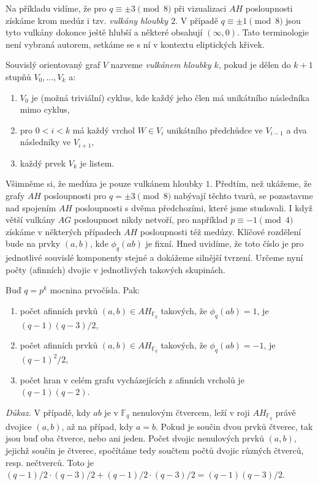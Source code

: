 \documentclass[12pt]{report}
\begin{document}
Na příkladu vidíme, že pro $q \equiv \pm 3 \pmod{8}$ při vizualizaci $AH$ posloupnosti získáme krom medúz i tzv. \textit{vulkány hloubky $2$}. V případě $q \equiv \pm 1 \pmod{8}$ jsou tyto vulkány dokonce ještě hlubší a některé obsahují $(\infty,0)$. Tato terminologie není vybraná autorem, setkáme se s ní v kontextu eliptických křivek.
\begin{definice}
Souvislý orientovaný graf $V$ nazveme \textit{vulkánem hloubky $k$}, pokud je dělen do $k+1$ stupňů $V_0,\dots,V_k$ a:
\begin{enumerate}
\item $V_0$ je (možná triviální) cyklus, kde každý jeho člen má unikátního následníka mimo cyklus,
\item pro $0 <i < k$ má každý vrchol $W \in V_i$ unikátního předchůdce ve $V_{i-1}$ a dva následníky ve $V_{i+1}$,
\item každý prvek $V_k$ je listem.
\end{enumerate}
\end{definice}
Všimněme si, že medúza je pouze vulkánem hloubky $1$. Předtím, než ukážeme, že grafy $AH$ posloupnosti pro $q = \pm 3 \pmod{8}$ nabývají těchto tvarů, se pozastavme nad spojením $AH$ posloupnosti s dvěma předchozími, které jsme studovali. I když větší vulkány $AG$ posloupnost nikdy netvoří, pro například $p \equiv -1 \pmod{4}$ získáme v některých případech $AH$ posloupnosti též medúzy. Klíčové rozdělení bude na prvky $(a,b)$, kde $\phi_q (ab)$ je fixní. Hned uvidíme, že toto číslo je pro jednotlivé souvislé komponenty stejné a dokážeme silnější tvrzení. Určeme nyní počty (afinních) dvojic v jednotlivých takových skupinách.

\begin{veta}
Buď $q = p^k$ mocnina prvočísla. Pak:
\begin{enumerate}
\item počet afinních prvků $(a,b) \in AH_{\mathbb{F}_q}$ takových, že $\phi_q(ab) = 1$, je $(q-1)(q-3)/2$, 
\item počet afinních prvků $(a,b) \in AH_{\mathbb{F}_q}$ takových, že $\phi_q(ab) = -1$, je $(q-1)^2/2$,
\item počet hran v celém grafu vycházejících z afinních vrcholů je $(q-1)(q-2)$.
\end{enumerate}

\end{veta}  
\noindent \textit{Důkaz.} V případě, kdy $ab$ je v $\mathbb{F}_q$ nenulovým čtvercem, leží v roji $AH_{\mathbb{F}_q}$ právě dvojice $(a,b)$, až na případ, kdy $a=b$. Pokud je součin dvou prvků čtverec, tak jsou buď oba čtverce, nebo ani jeden. Počet dvojic nenulových prvků $(a,b)$, jejichž součin je čtverec, spočítáme tedy součtem počtů dvojic různých čtverců, resp. nečtverců. Toto je $(q-1)/2 \cdot (q-3)/2 + (q-1)/2 \cdot (q-3)/2 =  (q-1)(q-3)/2$.
\end{document}
